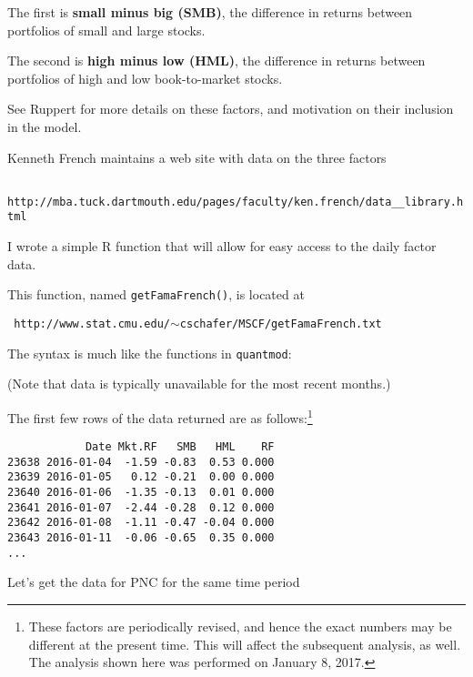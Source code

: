 \documentclass{report}
\begin{document}
The first is {\bf small minus big (SMB)}, the difference
in returns between portfolios of small and large stocks.

The second is {\bf high minus low (HML)}, the difference
in returns between portfolios of high and low book-to-market
stocks.

See Ruppert for more details on these factors,
and motivation on their inclusion in the model.

\newpage
Kenneth French maintains a web site with data on the three factors

\vspace{-.3in}
\normalsize
{\tt
http://mba.tuck.dartmouth.edu/pages/faculty/ken.french/data\_\_library.html}

\Large

I wrote a simple R function that will allow for easy access to the
daily factor data.

This function, named {\tt getFamaFrench()}, is located at

\vspace{-.3in}
\normalsize
{\tt
http://www.stat.cmu.edu/$\sim$cschafer/MSCF/getFamaFrench.txt}

\Large

The syntax is much like the functions in {\tt quantmod}:


(Note that data is typically unavailable for the most recent months.)

The first few rows of the data returned are as follows:\footnote{These 
factors are periodically revised, and hence the exact
numbers may be different at the present time. This will affect the
subsequent analysis, as well. The analysis shown here was performed on
January 8, 2017.}

\vspace{-.2in}
\normalsize
\begin{verbatim}
            Date Mkt.RF   SMB   HML    RF
23638 2016-01-04  -1.59 -0.83  0.53 0.000
23639 2016-01-05   0.12 -0.21  0.00 0.000
23640 2016-01-06  -1.35 -0.13  0.01 0.000
23641 2016-01-07  -2.44 -0.28  0.12 0.000
23642 2016-01-08  -1.11 -0.47 -0.04 0.000
23643 2016-01-11  -0.06 -0.65  0.35 0.000
...
\end{verbatim}
\Large

\newpage
Let's get the data for PNC for the same time period

\end{document}
